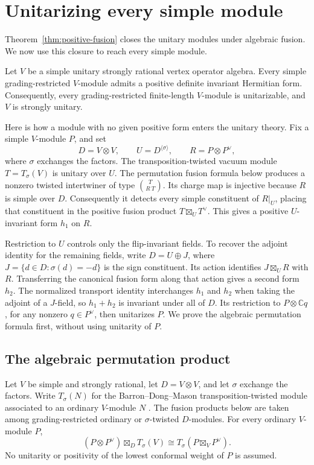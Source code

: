 \section{Unitarizing every simple module}
\label{sec:unitarity}

Theorem~\ref{thm:positive-fusion} closes the unitary modules under
algebraic fusion. We now use this closure to reach every simple module.

\begin{theorem}\label{thm:strong-unitarity}
Let $V$ be a simple unitary strongly rational vertex operator algebra.
Every simple grading-restricted $V$-module admits a positive definite
invariant Hermitian form. Consequently, every grading-restricted
finite-length $V$-module is unitarizable, and $V$ is strongly unitary.
\end{theorem}

Here is how a module with no given positive form enters the unitary
theory. Fix a simple $V$-module $P$, and set
\[
 D=V\otimes V,\qquad
 U=D^{\langle\sigma\rangle},\qquad R=P\otimes P^\vee,
\]
where $\sigma$ exchanges the factors. The transposition-twisted vacuum
module $T=T_\sigma(V)$ is unitary over $U$. The permutation fusion
formula below produces a nonzero twisted intertwiner of type
$\binom{T}{R\ T}$. Its charge map is injective because $R$ is simple
over $D$. Consequently it detects every simple constituent of $R|_U$,
placing that constituent in the positive fusion product
$T\boxtimes_U T^\vee$. This gives a positive $U$-invariant form $h_1$
on $R$.

Restriction to $U$ controls only the flip-invariant fields. To recover
the adjoint identity for the remaining fields, write $D=U\oplus J$,
where $J=\{d\in D:\sigma(d)=-d\}$ is the sign constituent. Its action identifies
$J\boxtimes_U R$ with $R$. Transferring the canonical fusion form along
that action gives a second form $h_2$. The normalized transport identity
interchanges $h_1$ and $h_2$ when taking the adjoint of a $J$-field, so
$h_1+h_2$ is invariant under all of $D$. Its restriction to
$P\otimes\mathbb Cq$, for any nonzero $q\in P^\vee$, then unitarizes
$P$. We prove the algebraic permutation formula first, without using
unitarity of $P$.

\subsection{The algebraic permutation product}

\begin{lemma}
\label{lem:permutation-before-positivity}
Let \(V\) be simple and strongly rational, let \(D=V\otimes V\),
and let \(\sigma\) exchange the factors. Write \(T_\sigma(N)\) for
the Barron--Dong--Mason transposition-twisted module associated to an
ordinary \(V\)-module \(N\) \cite[Theorem~3.9]{BDM}.
The fusion products below are taken among grading-restricted
ordinary or \(\sigma\)-twisted \(D\)-modules. For every ordinary
\(V\)-module \(P\),
\[
 (P\otimes P^\vee)\boxtimes_D T_\sigma(V)
 \cong T_\sigma(P\boxtimes_V P^\vee).
\]
No unitarity or positivity of the lowest conformal weight of \(P\)
is assumed.
\end{lemma}

